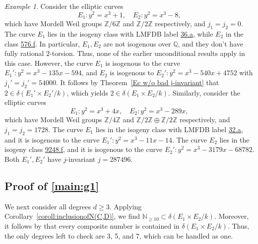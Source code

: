 \documentclass[a4paper,11pt]{amsart}
\theoremstyle{plain}
\theoremstyle{remark}
\newtheorem{example}[thm]{Example}
\newcommand{\bQ}{\mathbb{Q}}
\newcommand{\nn}{\mathbb{N}}
\newcommand{\bZ}{\mathbb{Z}}
\newcommand{\dendegs}{\delta}
\begin{document}
\begin{example}
    Consider the elliptic curves 
    $$E_1: y^2=x^3+1, \quad E_2: y^2=x^3-8,$$ which have Mordell Weil groups $\bZ/6\bZ$ and $\bZ/2\bZ$ respectively, and $j_1=j_2=0$. The curve $E_1$ lies in the isogeny class with LMFDB label  \href{https://www.lmfdb.org/EllipticCurve/Q/144/a/}{36.a}, while $E_2$ in the class \href{https://www.lmfdb.org/EllipticCurve/Q/144/a/}{576.f}. In particular, $E_1, E_2$ are not isogenous over $\bQ$, and they don't have fully rational $2$-torsion. Thus, none of the earlier unconditional results apply in this case. However, the curve $E_1$ is isogenous to the curve $E_1': y^2=x^3-135x-594$, and $E_2$ is isogenous to $E_2':y^2=x^3-540x+4752$ with  $j_1'=j_2'=54000$. It follows by Theorem~\ref{Ec w/o bad j-invariant} that $2\in\dendegs(E_1'\times E_2'/k)$, which yields $2\in\dendegs(E_1\times E_2/k)$. 
Similarly, consider the elliptic curves $$E_1: y^2=x^3+4x, \quad E_2: y^2=x^3-289x,$$ which have Mordell Weil groups $\bZ/4\bZ$ and $\bZ/2\bZ\oplus\bZ/2\bZ$ respectively, and $j_1=j_2=1728$. The curve $E_1$ lies in the isogeny class with LMFDB label  \href{https://www.lmfdb.org/EllipticCurve/Q/144/a/}{32.a}, 
    and it is isogenous to the curve $E_1':y^2=x^3-11x-14$. 
    The curve $E_2$ lies in the isogeny class  \href{https://www.lmfdb.org/EllipticCurve/Q/144/a/}{9248.f}, 
    and it is isogenous to the curve $E_2':y^2=x^3-3179x-68782$. Both $E_1', E_2'$ have $j$-invariant $j=287496$. 
\end{example}

\subsection{Proof of \eqref{main:g1}} \label{subsec:proofofmain1}
We next consider all degrees $d\geq 3$. Applying Corollary~\ref{coroll:inclusionofN(C,D)}, we find $\nn_{\geq 10} \subset \dendegs(E_1 \times E_2 / k)$. Moreover, it follows by  that every composite number is contained in $\dendegs(E_1\times E_2/k)$. Thus, the only degrees left to check are 3, 5, and 7, which can be handled as one.
\end{document}

